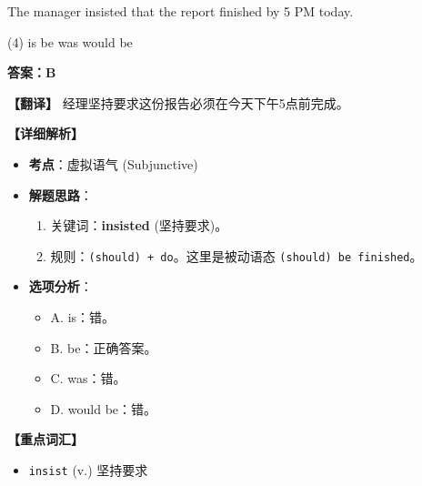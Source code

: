\documentclass[11pt, a4paper]{article}
\newcommand{\analysis}[4]{
    \begin{solutionbox}
        \textbf{答案：#1}
        
        \textbf{【翻译】} #2
        
        \textbf{【详细解析】}
        #3
        
        \textbf{【重点词汇】}
        #4
    \end{solutionbox}
}
\newcommand{\blank}{\underline{\hspace{1.5cm}}}
\begin{document}
\begin{questions}
    \item The manager insisted that the report \blank finished by 5 PM today.
    \begin{tasks}(4)
        \task is \task be \task was \task would be
    \end{tasks}
    \analysis{B}{经理坚持要求这份报告必须在今天下午5点前完成。}{
        \begin{itemize}
            \item \textbf{考点}：虚拟语气 (Subjunctive)
            \item \textbf{解题思路}：
                \begin{enumerate}
                    \item 关键词：\textbf{insisted} (坚持要求)。
                    \item 规则：\texttt{(should) + do}。这里是被动语态 \texttt{(should) be finished}。
                \end{enumerate}
            \item \textbf{选项分析}：
                \begin{itemize}
                    \item A. is：错。
                    \item B. be：正确答案。
                    \item C. was：错。
                    \item D. would be：错。
                \end{itemize}
        \end{itemize}
    }{
        \begin{itemize}
            \item \texttt{insist} (v.) 坚持要求
        \end{itemize}
    }


\end{questions}
\end{document}
